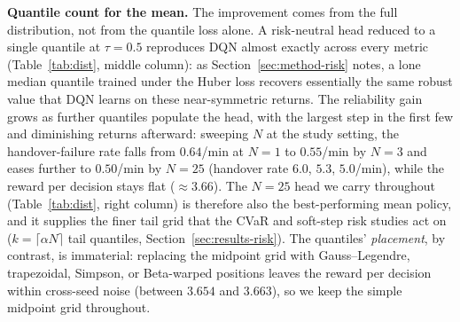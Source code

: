 \documentclass[conference]{IEEEtran}
\begin{document}
\textbf{Quantile count for the mean.}
The improvement comes from the full
distribution, not from the quantile loss alone. A risk-neutral head reduced to a
single quantile at $\tau=0.5$ reproduces DQN almost exactly across every metric
(Table~\ref{tab:dist}, middle column): as Section~\ref{sec:method-risk} notes, a
lone median quantile trained under the Huber loss recovers essentially the same
robust value that DQN learns on these near-symmetric returns. The reliability gain
grows as further quantiles populate the head, with the largest step in the first
few and diminishing returns afterward: sweeping $N$ at the study setting, the
handover-failure rate falls from $0.64$/min at $N{=}1$ to $0.55$/min by $N{=}3$ and
eases further to $0.50$/min by $N{=}25$ (handover rate $6.0$, $5.3$, $5.0$/min),
while the reward per decision stays flat (${\approx}3.66$). The $N{=}25$
head we carry throughout (Table~\ref{tab:dist}, right column) is therefore also the
best-performing mean policy, and it supplies the finer tail grid that the CVaR and
soft-step risk studies act on ($k=\lceil\alpha N\rceil$ tail quantiles,
Section~\ref{sec:results-risk}). The quantiles'
\emph{placement}, by contrast, is immaterial:
replacing the midpoint grid with Gauss--Legendre, trapezoidal, Simpson, or
Beta-warped positions leaves the reward per decision within cross-seed noise
(between $3.654$ and $3.663$), so we keep the simple midpoint grid throughout.
\end{document}
